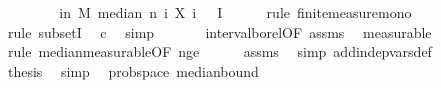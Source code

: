 \begin{isabellebody}
\ \ \isamarkupfalse%
\ \isamarkupfalse%
\ {\isachardoublequoteopen}{\isachardot}{\kern0pt}{\isachardot}{\kern0pt}{\isachardot}{\kern0pt}\ {\isasymle}\ {\isasymP}{\isacharparenleft}{\kern0pt}{\isasymomega}\ in\ M{\isachardot}{\kern0pt}\ median\ n\ {\isacharparenleft}{\kern0pt}{\isasymlambda}i{\isachardot}{\kern0pt}\ X\ i\ {\isasymomega}{\isacharparenright}{\kern0pt}\ {\isasymin}\ I{\isacharparenright}{\kern0pt}{\isachardoublequoteclose}\isanewline
\ \ \ \ \isamarkupfalse%
\ {\isacharparenleft}{\kern0pt}rule\ finite{\isacharunderscore}{\kern0pt}measure{\isacharunderscore}{\kern0pt}mono{\isacharparenright}{\kern0pt}\isanewline
\ \ \ \ \ \isamarkupfalse%
\ {\isacharparenleft}{\kern0pt}rule\ subsetI{\isacharparenright}{\kern0pt}\ \isamarkupfalse%
\ c\ \isamarkupfalse%
\ simp\ \isanewline
\ \ \ \ \isamarkupfalse%
\ interval{\isacharunderscore}{\kern0pt}borel{\isacharbrackleft}{\kern0pt}OF\ assms{\isacharparenleft}{\kern0pt}{}{\isacharparenright}{\kern0pt}{\isacharbrackright}{\kern0pt}\ \isamarkupfalse%
\ measurable\isanewline
\ \ \ \ \isamarkupfalse%
\ {\isacharparenleft}{\kern0pt}rule\ median{\isacharunderscore}{\kern0pt}measurable{\isacharbrackleft}{\kern0pt}OF\ n{\isacharunderscore}{\kern0pt}ge{\isacharunderscore}{\kern0pt}{}{\isacharbrackright}{\kern0pt}{\isacharparenright}{\kern0pt}\isanewline
\ \ \ \ \isamarkupfalse%
\ assms{\isacharparenleft}{\kern0pt}{}{\isacharparenright}{\kern0pt}\ \isamarkupfalse%
\ {\isacharparenleft}{\kern0pt}simp\ add{\isacharcolon}{\kern0pt}indep{\isacharunderscore}{\kern0pt}vars{\isacharunderscore}{\kern0pt}def{\isacharparenright}{\kern0pt}\isanewline
\ \ \isamarkupfalse%
\ \isamarkupfalse%
\ {\isacharquery}{\kern0pt}thesis\ \isamarkupfalse%
\ simp\isanewline
{}\isamarkupfalse%
%
\endisatagproof
{\isafoldproof}%
%
\isadelimproof
\isanewline
%
\endisadelimproof
\isanewline
{}\isamarkupfalse%
\ {\isacharparenleft}{\kern0pt}\ prob{\isacharunderscore}{\kern0pt}space{\isacharparenright}{\kern0pt}\ median{\isacharunderscore}{\kern0pt}bound{\isacharunderscore}{\kern0pt}{}{\isacharcolon}{\kern0pt}\isanewline
\ \ \ {\isachardoublequoteopen}{\isasymalpha}\ {\isachargreater}{\kern0pt}\ {}{\isachardoublequoteclose}\isanewline
\ \ \ {\isachardoublequoteopen}{\isasymepsilon}\ {\isasymin}\ {\isacharbraceleft}{\kern0pt}{}{\isacharless}{\kern0pt}{\isachardot}{\kern0pt}{\isachardot}{\kern0pt}{\isacharless}{\kern0pt}{}{\isacharbraceright}{\kern0pt}{\isachardoublequoteclose}\isanewline

\end{isabellebody}
